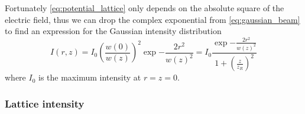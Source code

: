 Fortunately \cref{eq:potential_lattice} only depends on the absolute
square of the electric field, thus we can drop the complex exponential from
\cref{eq:gaussian_beam} to find an expression for the Gaussian intensity
distribution
\begin{equation}
  I(r,z)
  =
  I_0
  {\left(\frac{w(0)}{w(z)}\right)}^2
  \exp{-\frac{2r^2}{w{(z)}^2}}
  =
  I_0
  \frac{\exp{-\frac{2r^2}{w{(z)}^2}}}{1+{\left(\frac{z}{z_R}\right)}^2}
  \label{eq:gaussian_intensity}
\end{equation}
where $I_0$ is the maximum intensity at $r=z=0$.

\subsubsection{Lattice intensity}

